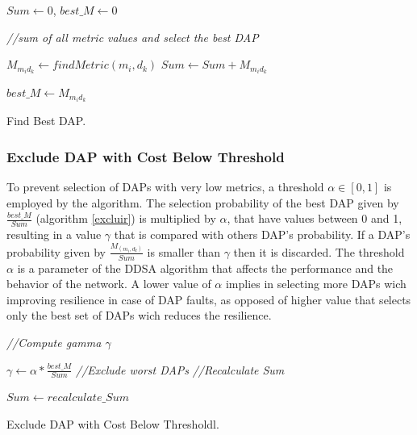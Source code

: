 \documentclass[conference]{IEEEtran}
\begin{document}
\IncMargin{1em}
\begin{algorithm}

$Sum \leftarrow 0$, $best\_M \leftarrow 0$

\emph{//sum of all metric values and select the best DAP}

 {

$M_{m_{i}d_{k}} \leftarrow findMetric(m_{i},d_{k})$ 
$Sum \leftarrow Sum + M_{m_{i}d_{k}}$

 {
$best\_M \leftarrow  M_{m_{i}d_{k}}$

}

}

\BlankLine
\caption{Find Best DAP.}
\label{amelhordap}
\end{algorithm}\DecMargin{1em}

\subsubsection{Exclude DAP with Cost Below Threshold}\label{sec:excluirdap}

To prevent selection of DAPs with very low metrics, a threshold  $\alpha \in [0,1]$ is employed by the algorithm. The selection probability of the best DAP given by $ \frac {best\_M}{Sum} $ (algorithm  \ref{excluir})  is multiplied by $\alpha$, that have values between 0 and 1, resulting in a value $\gamma$ that is compared with others DAP’s probability. If a DAP’s probability given by $\frac {M_{(m_{i},d_{k})}}{Sum}$ is smaller than $\gamma$ then it is discarded. The threshold $\alpha$ is a parameter of the DDSA algorithm that affects the performance and the behavior of the network. A lower value of $\alpha$ implies in selecting more DAPs wich improving resilience in case of DAP faults, as opposed of higher value that selects only the best set of DAPs wich reduces the resilience.

\IncMargin{1em}
\begin{algorithm}

 
\emph{//Compute gamma $\gamma$}

\BlankLine
$\gamma \leftarrow \alpha * \frac {best\_M}{Sum} $
\BlankLine
\emph{//Exclude worst DAPs }
\BlankLine
{}
\emph{//Recalculate Sum}

$Sum \leftarrow $\textit{$recalculate\_Sum$}

\BlankLine
\caption{Exclude DAP with Cost Below Thresholdl.}
\label{excluir}

\end{algorithm}\DecMargin{1em}
\end{document}
